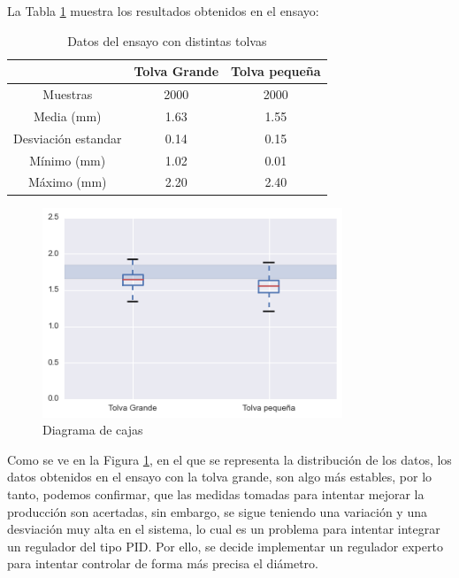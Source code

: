 La Tabla \ref{tab:ensa_tolvas} muestra los resultados obtenidos en el ensayo:

\begin{table}[H]
    \centering
    \begin{tabular}{ccc}
                            & Tolva Grande & Tolva pequeña \\ \hline
        Muestras               & 2000  & 2000   \\
        Media (mm)          & 1.63     & 1.55      \\
        Desviación estandar & 0.14     & 0.15      \\
        Mínimo (mm)             & 1.02     & 0.01      \\
        Máximo (mm)             & 2.20     & 2.40     
    \end{tabular}
    \caption{Datos del ensayo con distintas tolvas}
    \label{tab:ensa_tolvas}
\end{table}

\begin{figure}[H]
    \centering
    \includegraphics[width=0.8\textwidth]{images/producciones/22072015/output_6_1.png}
    \caption{Diagrama de cajas }
    \label{fig:22072015-boxplot}
\end{figure}

Como se ve en la Figura \ref{fig:22072015-boxplot}, en el que se representa la distribución de los datos, los datos obtenidos en el ensayo con la tolva grande, son algo más estables, por lo tanto, podemos confirmar, que las medidas tomadas para intentar mejorar la producción son acertadas, sin embargo, se sigue teniendo una variación y una desviación muy alta en el sistema, lo cual es un problema para intentar integrar un regulador del tipo PID. Por ello, se decide implementar un regulador experto para intentar controlar de forma más precisa el diámetro.


